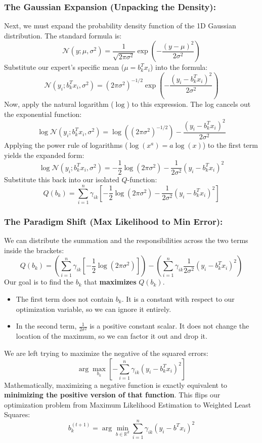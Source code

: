 \documentclass[twoside, 10pt]{article}
\begin{document}
\subsubsection{The Gaussian Expansion (Unpacking the Density):}
Next, we must expand the probability density function of the 1D Gaussian distribution. The standard formula is:
\[
\mathcal{N}(y; \mu, \sigma^2) = \frac{1}{\sqrt{2\pi\sigma^2}} \exp\left(-\frac{(y - \mu)^2}{2\sigma^2}\right)
\]
Substitute our expert's specific mean ($\mu = b_k^T x_i$) into the formula:
\[
\mathcal{N}(y_i; b_k^T x_i, \sigma^2) = (2\pi\sigma^2)^{-1/2} \exp\left(-\frac{(y_i - b_k^T x_i)^2}{2\sigma^2}\right)
\]
Now, apply the natural logarithm ($\log$) to this expression. The log cancels out the exponential function:
\[
\log \mathcal{N}(y_i; b_k^T x_i, \sigma^2) = \log\left((2\pi\sigma^2)^{-1/2}\right) - \frac{(y_i - b_k^T x_i)^2}{2\sigma^2}
\]
Applying the power rule of logarithms ($\log(x^a) = a\log(x)$) to the first term yields the expanded form:
\[
\log \mathcal{N}(y_i; b_k^T x_i, \sigma^2) = -\frac{1}{2}\log(2\pi\sigma^2) - \frac{1}{2\sigma^2}(y_i - b_k^T x_i)^2
\]
Substitute this back into our isolated $Q$-function:
\[
Q(b_k) = \sum_{i=1}^n \gamma_{ik} \left[ -\frac{1}{2}\log(2\pi\sigma^2) - \frac{1}{2\sigma^2}(y_i - b_k^T x_i)^2 \right]
\]
\subsubsection{The Paradigm Shift (Max Likelihood to Min Error):}
We can distribute the summation and the responsibilities across the two terms inside the brackets:
\[
Q(b_k) = \left( \sum_{i=1}^n \gamma_{ik} \left[-\frac{1}{2}\log(2\pi\sigma^2)\right] \right) - \left( \sum_{i=1}^n \gamma_{ik} \frac{1}{2\sigma^2}(y_i - b_k^T x_i)^2 \right)
\]
Our goal is to find the $b_k$ that \textbf{maximizes} $Q(b_k)$.
\begin{itemize}
    \item The first term does not contain $b_k$. It is a constant with respect to our optimization variable, so we can ignore it entirely.
    \item In the second term, $\frac{1}{2\sigma^2}$ is a positive constant scalar. It does not change the location of the maximum, so we can factor it out and drop it.
\end{itemize}
We are left trying to maximize the negative of the squared errors:
\[
\arg \max_{b_k} \left[ - \sum_{i=1}^n \gamma_{ik} (y_i - b_k^T x_i)^2 \right]
\]
Mathematically, maximizing a negative function is exactly equivalent to \textbf{minimizing the positive version of that function}. This flips our optimization problem from Maximum Likelihood Estimation to Weighted Least Squares:
\[
b_k^{(t+1)} = \arg \min_{b \in \mathbb{R}^d} \sum_{i=1}^n \gamma_{ik} (y_i - b^T x_i)^2
\]
\end{document}
